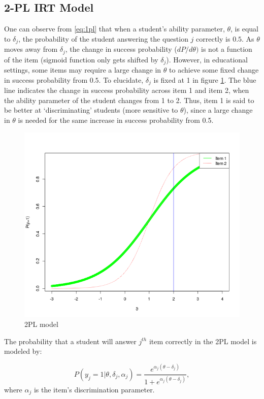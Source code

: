 \documentclass[12pt]{article}
\begin{document}
\subsection{2-PL IRT Model}
One can observe from \eqref{eq:1pl} that when a student's ability parameter, $\theta$, is equal to $\delta_j$, the probability of the student answering the question $j$ correctly is $0.5$. As $\theta$ moves away from $\delta_j$, the change in success probability ($dP/ d\theta) $ is not a function of the item (sigmoid function only gets shifted by $\delta_j$). However, in educational settings, some items may require a large change in $\theta$ to achieve some fixed change in success probability from $0.5$. To elucidate, $\delta_j$ is fixed at 1 in figure \ref{fig:2pl}. The blue line indicates the change in success probability across item 1 and item 2, when the ability parameter of the student changes from 1 to 2. Thus, item 1 is said to be better at `discriminating' students (more sensitive to $\theta$), since a large change in $\theta$ is needed for the same increase in success probability from 0.5.

\begin{figure}[t]
    \includegraphics[scale=0.5]{Plots/2pl.png}
    \centering
    \caption{2PL model}
    \label{fig:2pl}
\end{figure}

The probability that a student will answer $j^{th}$ item correctly in the 2PL model is modeled by:

\begin{equation}\label{eq:2pl}
    P(y_j=1|\theta, \delta_j, \alpha_j) = \frac{e^{\alpha_j(\theta - \delta_j)}}{1+e^{\alpha_j(\theta - \delta_j)}},
\end{equation}
where $\alpha_j$ is the item's discrimination parameter.
\end{document}

